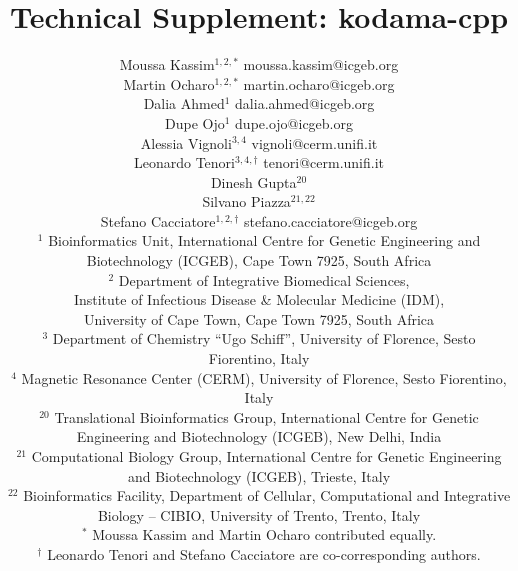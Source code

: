 \documentclass[twoside,11pt]{article}
\begin{document}
\title{Technical Supplement: kodama-cpp}
\author{%
\name Moussa Kassim$^{1,2,*}$ \email moussa.kassim@icgeb.org \\
\name Martin Ocharo$^{1,2,*}$ \email martin.ocharo@icgeb.org \\
\name Dalia Ahmed$^{1}$ \email dalia.ahmed@icgeb.org \\
\name Dupe Ojo$^{1}$ \email dupe.ojo@icgeb.org \\
\name Alessia Vignoli$^{3,4}$ \email vignoli@cerm.unifi.it \\
\name Leonardo Tenori$^{3,4,\dagger}$ \email tenori@cerm.unifi.it \\
\name Dinesh Gupta$^{20}$ \\
\name Silvano Piazza$^{21,22}$ \\
\name Stefano Cacciatore$^{1,2,\dagger}$ \email stefano.cacciatore@icgeb.org \\
\addr $^{1}$ Bioinformatics Unit, International Centre for Genetic Engineering and Biotechnology (ICGEB), Cape Town 7925, South Africa \\
\addr $^{2}$ Department of Integrative Biomedical Sciences, \\ \addr Institute of Infectious Disease \& Molecular Medicine (IDM), \\ \addr University of Cape Town, Cape Town 7925, South Africa \\
\addr $^{3}$ Department of Chemistry ``Ugo Schiff'', University of Florence, Sesto Fiorentino, Italy \\
\addr $^{4}$ Magnetic Resonance Center (CERM), University of Florence, Sesto Fiorentino, Italy \\
\addr $^{20}$ Translational Bioinformatics Group, International Centre for Genetic Engineering and Biotechnology (ICGEB), New Delhi, India \\
\addr $^{21}$ Computational Biology Group, International Centre for Genetic Engineering and Biotechnology (ICGEB), Trieste, Italy \\
\addr $^{22}$ Bioinformatics Facility, Department of Cellular, Computational and Integrative Biology -- CIBIO, University of Trento, Trento, Italy \\
\addr $^{*}$ Moussa Kassim and Martin Ocharo contributed equally. \\
\addr $^{\dagger}$ Leonardo Tenori and Stefano Cacciatore are co-corresponding authors. \\
}
\maketitle
\end{document}
